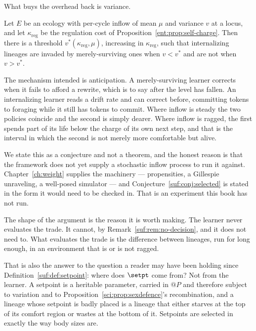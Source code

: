 What buys the overhead back is variance.

\begin{conjecture}
\label{suf:conj:selected}
Let $E$ be an ecology with per-cycle inflow of mean $\mu$ and variance
$v$ at a locus, and let $\kappa_{\mathrm{reg}}$ be the regulation cost of
Proposition~\ref{ent:prop:self-charge}.
Then there is a threshold $v^\ast(\kappa_{\mathrm{reg}}, \mu)$, increasing
in $\kappa_{\mathrm{reg}}$, such that internalizing lineages are invaded
by merely-surviving ones when $v < v^\ast$ and are not when $v > v^\ast$.
\end{conjecture}

The mechanism intended is anticipation.
A merely-surviving learner corrects when it fails to afford a rewrite,
which is to say after the level has fallen.
An internalizing learner reads a drift rate and can correct before,
committing tokens to foraging while it still has tokens to commit.
Where inflow is steady the two policies coincide and the second is simply
dearer.
Where inflow is ragged, the first spends part of its life below the
charge of its own next step, and that is the interval in which the second
is not merely more comfortable but alive.

We state this as a conjecture and not a theorem, and the honest reason is
that the framework does not yet supply a stochastic inflow process to run
it against.
Chapter~\ref{ch:weight} supplies the machinery --- propensities, a
Gillespie unraveling, a well-posed simulator --- and
Conjecture~\ref{suf:conj:selected} is stated in the form it would need
to be checked in.
That is an experiment this book has not run.

\begin{remark}
\label{suf:rem:nobody-chose}
The shape of the argument is the reason it is worth making.
The learner never evaluates the trade.
It cannot, by Remark~\ref{suf:rem:no-decision}, and it does not need to.
What evaluates the trade is the difference between lineages, run for long
enough, in an environment that is or is not ragged.

That is also the answer to the question a reader may have been holding
since Definition~\ref{suf:def:setpoint}: where does $\setpt$ come from?
Not from the learner.
A setpoint is a heritable parameter, carried in $@P$ and therefore subject
to variation and to Proposition~\ref{sci:prop:sexdefence}'s recombination,
and a lineage whose setpoint is badly placed is a lineage that either
starves at the top of its comfort region or wastes at the bottom of it.
Setpoints are selected in exactly the way body sizes are.
\end{remark}

